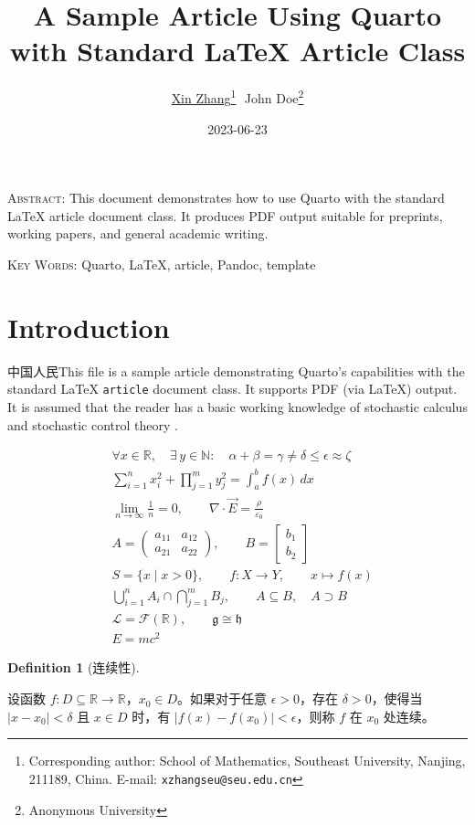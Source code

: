 \documentclass[
  11pt,
]{article}
\title{\Large A Sample Article Using Quarto with Standard LaTeX Article
Class}
\author{\href{https://math.seu.edu.cn/zx\_en/list.htm}{Xin
Zhang}\footnote{Corresponding author: School of Mathematics, Southeast
University, Nanjing, 211189, China. E-mail: \texttt{xzhangseu@seu.edu.cn}}\,~\orcidlink{0000-0001-6670-5351}\hspace{2em}John
Doe\footnote{Anonymous University}}
\date{\small 2023-06-23}
\theoremstyle{plain}
\theoremstyle{plain}
\theoremstyle{plain}
\theoremstyle{definition}
\newtheorem{definition}{Definition}[section]
\theoremstyle{remark}
\begin{document}
\maketitle

{\small\noindent\textsc{Abstract}: This document demonstrates how to use
Quarto with the standard LaTeX article document class. It produces PDF
output suitable for preprints, working papers, and general academic
writing.}
\smallskip

\noindent\textsc{Key Words}: Quarto, LaTeX, article, Pandoc, template


\section{Introduction}\label{sec-intro}

中国人民This file is a sample article demonstrating Quarto's
capabilities with the standard LaTeX \texttt{article} document class. It
supports PDF (via LaTeX) output. It is assumed that the reader has a
basic working knowledge of stochastic calculus
\citet{karatzas1991brownian} and stochastic control theory
\citet{yong1999sch}.

\[
\begin{aligned}
&\forall x \in \mathbb{R},\quad 
\exists\, y \in \mathbb{N}:\quad 
\alpha + \beta = \gamma \neq \delta \leq \epsilon \approx \zeta \\
&\sum_{i=1}^{n} x_i^2 + \prod_{j=1}^{m} y_j^2 = \int_{a}^{b} f(x)\,dx \\
&\lim_{n\to\infty} \frac{1}{n} = 0, \qquad
\nabla \cdot \vec{E} = \frac{\rho}{\varepsilon_0} \\
&A = \begin{pmatrix} a_{11} & a_{12} \\ a_{21} & a_{22} \end{pmatrix}, \qquad
B = \begin{bmatrix} b_1 \\ b_2 \end{bmatrix} \\
&S = \{ x \mid x > 0 \}, \qquad
f: X \to Y, \qquad
x \mapsto f(x) \\
&\bigcup_{i=1}^n A_i \cap \bigcap_{j=1}^m B_j, \qquad
A \subseteq B, \quad A \supset B \\
&\mathcal{L} = \mathcal{F}(\mathbb{R}), \qquad
\mathfrak{g} \cong \mathfrak{h} \\
&\boxed{E = mc^2}
\end{aligned}
\]

\begin{definition}[连续性]\protect\hypertarget{def-continuous}{}\label{def-continuous}

设函数
\(f: D \subseteq \mathbb{R} \to \mathbb{R}\)，\(x_0 \in D\)。如果对于任意
\(\epsilon > 0\)，存在 \(\delta > 0\)，使得当 \(|x - x_0| < \delta\) 且
\(x \in D\) 时，有 \(|f(x) - f(x_0)| < \epsilon\)，则称 \(f\) 在 \(x_0\)
处连续。

\end{definition}
\end{document}
